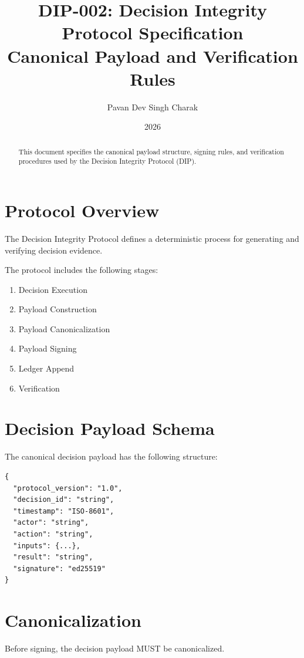 \documentclass[11pt]{article}
\title{DIP-002: Decision Integrity Protocol Specification\\
Canonical Payload and Verification Rules}
\author{Pavan Dev Singh Charak}
\date{2026}
\begin{document}
\maketitle

\begin{abstract}

This document specifies the canonical payload structure,
signing rules, and verification procedures used by the
Decision Integrity Protocol (DIP).

\end{abstract}

\section{Protocol Overview}

The Decision Integrity Protocol defines a deterministic
process for generating and verifying decision evidence.

The protocol includes the following stages:

\begin{enumerate}
\item Decision Execution
\item Payload Construction
\item Payload Canonicalization
\item Payload Signing
\item Ledger Append
\item Verification
\end{enumerate}

\section{Decision Payload Schema}

The canonical decision payload has the following structure:

\begin{verbatim}
{
  "protocol_version": "1.0",
  "decision_id": "string",
  "timestamp": "ISO-8601",
  "actor": "string",
  "action": "string",
  "inputs": {...},
  "result": "string",
  "signature": "ed25519"
}
\end{verbatim}

\section{Canonicalization}

Before signing, the decision payload MUST be canonicalized.
\end{document}
